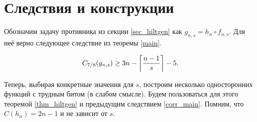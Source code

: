 \documentclass[a4paper, 14pt]{extarticle}
\begin{document}
\section{Следствия и конструкции}
\label{sec_corr}

Обозначим задачу противника из секции \ref{sec_hiltgen} как $g_{n, s} = h_n
\circ f_{n, s}$. Для неё верно следующее следствие из теоремы \ref{main}.

\begin{corollary}
\[
C_{7/8}(g_{n, s}) \geq 3n - \ceil*{\frac {n - 1} s} - 5.
\]
\label{corr_main}
\end{corollary}

% 

Теперь, выбирая конкретные значения для $s$, построим несколько односторонних
функций с трудным битом (в слабом смысле). Будем пользоваться для этого теоремой
\ref{thm_hiltgen} и предыдущим следствием \ref{corr_main}. Помним, что $C(h_n) =
2n - 1$ и не зависит от $s$.
\end{document}
